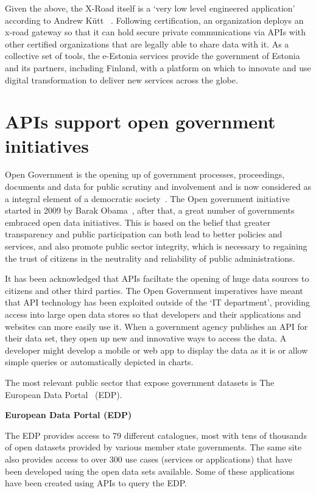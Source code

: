 Given the above, the X-Road itself is a ‘very low level engineered application’
according to Andrew Kütt ~\citep{andrew_kutt}. Following certification, an organization
deploys an x-road gateway
so that it can hold secure private communications via APIs with other certified
organizations that are legally able to share data with it. As a collective set 
of tools, the e-Estonia services provide the government of Estonia and its partners,
including Finland, with a platform on which to innovate and use digital
transformation to deliver new services across the globe.

\section{APIs support open government initiatives}

Open Government is the opening up of government processes,
proceedings, documents and data for public scrutiny and involvement and is
now considered as a integral element of a democratic society~\citep{open_gov}.
The Open government initiative started in 2009 by Barak Obama~\citep{whitehouse_archives}, after that,
a great number of governments embraced open data initiatives. This is based on the
belief that greater transparency and public participation can both lead
to better policies and services, and also promote public sector
integrity, which is necessary to regaining the trust of citizens in the
neutrality and reliability of public administrations.

It has been acknowledged that APIs faciltate the opening of huge data sources
to citizens and other third parties. The Open Government imperatives have meant
that API technology has been exploited outside of the ‘IT department’,
providing access into large open data stores so that developers and their
applications and websites can more easily use it. When a government agency
publishes an API for their data set, they open up new and innovative ways to
access the data. A developer might develop a mobile or web app to display the
data as it is or allow simple queries or automatically depicted in charts.

The most relevant public sector that expose government datasets is The European
Data Portal~\citep{edp_use_cases} (EDP).

\textbf{European Data Portal (EDP)}

The EDP provides access to 79 different catalogues, most with tens of thousands of
open datasets provided by various member state governments. The same site also provides
access to over 300 use cases (services or applications) that have been developed
using the open data sets available. Some of these applications have been created
using APIs to query the EDP.

